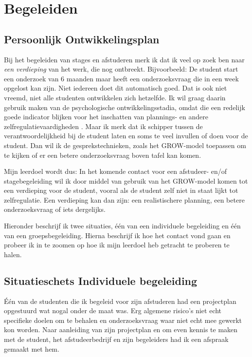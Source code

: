 \section{Begeleiden}
\subsection{Persoonlijk Ontwikkelingsplan}

Bij het begeleiden van stages en afstuderen merk ik dat ik veel op zoek ben naar \textit{een verdieping} van het werk, die nog ontbreekt. Bijvoorbeeld: De student start een onderzoek van 6 maanden maar heeft een onderzoeksvraag die in een week opgelost kan zijn. Niet iedereen doet dit automatisch goed. Dat is ook niet vreemd, niet alle studenten ontwikkelen zich hetzelfde. Ik wil graag daarin gebruik maken van de psychologische ontwikkelingsstadia, omdat die een redelijk goede indicator blijken voor het inschatten van plannings- en andere zelfregulatievaardigheden \cite{luken2008mogelijkheid}. Maar ik merk dat ik schipper tussen de verantwoordelijkheid bij de student laten en soms te veel invullen of doen voor de student. Dan wil ik de gesprekstechnieken, zoals het GROW-model toepassen om te kijken of er een betere onderzoeksvraag boven tafel kan komen.

Mijn leerdoel wordt dus:
In het komende contact voor een afstudeer- en/of stagebegeleiding wil ik door middel van gebruik van het GROW-model komen tot een verdieping voor de student, vooral als de student zelf niet in staat lijkt tot zelfregulatie. Een verdieping kan dan zijn: een realistischere planning, een betere onderzoeksvraag of iets dergelijks.

Hieronder beschrijf ik twee situaties, één van een individuele begeleiding en één van een groepsbegeleiding. Hierna beschrijf ik hoe het contact vond gaan en probeer ik in te zoomen op hoe ik mijn leerdoel heb getracht te proberen te halen.

\subsection{Situatieschets Individuele begeleiding}
\label{sec:individu}
Één van de studenten die ik begeleid voor zijn afstuderen had een projectplan opgestuurd wat nogal onder de maat was. Erg algemene risico's niet echt specifieke doelen om te behalen en onderzoeksvraag waar niet echt mee gewerkt kon worden. Naar aanleiding van zijn projectplan en om even kennis te maken met de student, het afstudeerbedrijf en zijn begeleiders had ik een afspraak gemaakt met hem.

